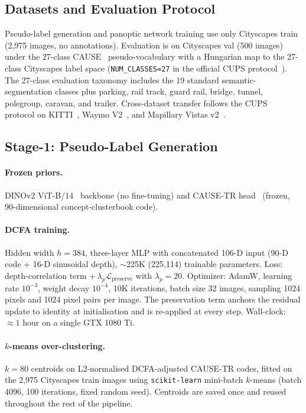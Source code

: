 \documentclass{article}
\begin{document}
\subsection{Datasets and Evaluation Protocol}
\label{sec:supp:impl:data}

Pseudo-label generation and panoptic network training use only Cityscapes train~\cite{cordts2016cityscapes} (2{,}975 images, no annotations). Evaluation is on Cityscapes val (500 images) under the 27-class CAUSE~\cite{kim2024cause} pseudo-vocabulary with a Hungarian map to the 27-class Cityscapes label space (\texttt{NUM\_CLASSES=27} in the official CUPS protocol~\cite{hahn2025cups}). The 27-class evaluation taxonomy includes the 19 standard semantic-segmentation classes plus parking, rail track, guard rail, bridge, tunnel, polegroup, caravan, and trailer. Cross-dataset transfer follows the CUPS~\cite{hahn2025cups} protocol on KITTI~\cite{geiger2012kitti}, Waymo V2~\cite{sun2020waymo}, and Mapillary Vistas v2~\cite{neuhold2017mapillary}.

\subsection{Stage-1: Pseudo-Label Generation}
\label{sec:supp:impl:stage1}

\paragraph{Frozen priors.}
DINOv2 ViT-B/14~\cite{oquab2024dinov2} backbone (no fine-tuning) and CAUSE-TR head~\cite{kim2024cause} (frozen, 90-dimensional concept-clusterbook code).

\paragraph{DCFA training.}
Hidden width $h{=}384$, three-layer MLP with concatenated 106-D input (90-D code + 16-D sinusoidal depth), $\sim$225K (225,114) trainable parameters. Loss: depth-correlation term $+\,\lambda_p \mathcal{L}_\text{preserve}$ with $\lambda_p{=}20$. Optimizer: AdamW, learning rate $10^{-3}$, weight decay $10^{-4}$, 10K iterations, batch size 32 images, sampling 1024 pixels and 1024 pixel pairs per image. The preservation term anchors the residual update to identity at initialisation and is re-applied at every step. Wall-clock: $\approx 1$ hour on a single GTX 1080 Ti.

\paragraph{$k$-means over-clustering.}
$k{=}80$ centroids on L2-normalised DCFA-adjusted CAUSE-TR codes, fitted on the 2{,}975 Cityscapes train images using \texttt{scikit-learn} mini-batch $k$-means (batch 4096, 100 iterations, fixed random seed). Centroids are saved once and reused throughout the rest of the pipeline.
\end{document}
